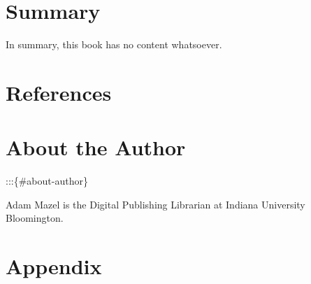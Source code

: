 \documentclass[
  11pt,
  letterpaper,
]{book}
\newlength{\cslhangindent}
\newlength{\cslentryspacingunit} %
\newenvironment{CSLReferences}[2] %
 {%
  \setlength{\parindent}{0pt}
  \ifodd #1
  \let\oldpar\par
  \def\par{\hangindent=\cslhangindent\oldpar}
  \fi
  \setlength{\parskip}{#2\cslentryspacingunit}
 }%
 {}
\begin{document}
\hypertarget{summary}{%
\chapter{Summary}\label{summary}}

In summary, this book has no content whatsoever.


\hypertarget{references}{%
\chapter*{References}\label{references}}


\hypertarget{refs}{}
\begin{CSLReferences}{0}{0}
\end{CSLReferences}


\hypertarget{about-the-author}{%
\chapter{About the Author}\label{about-the-author}}

:::\{\#about-author\}

Adam Mazel is the Digital Publishing Librarian at Indiana University
Bloomington.

\cleardoublepage
{}
{}
\appendix

\hypertarget{appendix}{%
\chapter{Appendix}\label{appendix}}


\backmatter
\end{document}
